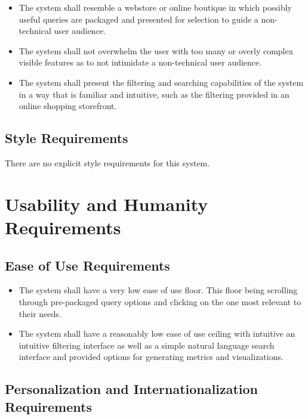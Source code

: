 \documentclass[12pt]{article}
\begin{document}
\begin{itemize}
    \item The system shall resemble a webstore or online boutique in which possibly useful queries are packaged and presented for selection to guide 
    a non-technical user audience.
    \item The system shall not overwhelm the user with too many or overly complex visible features as to not intimidate a non-technical user audience.
    \item The system shall present the filtering and searching capabilities of the system in a way that is familiar and intuitive, such as the 
    filtering provided in an online shopping storefront.
\end{itemize}

\subsection{Style Requirements}

\par{There are no explicit style requirements for this system.}

\section{Usability and Humanity Requirements}



\subsection{Ease of Use Requirements}

\begin{itemize}
    \item The system shall have a very low ease of use floor. This floor being scrolling through
    pre-packaged query options and clicking on the one most relevant to their needs.
    \item The system shall have a reasonably low ease of use ceiling with intuitive an intuitive filtering interface
    as well as a simple natural language search interface and provided options for generating metrics and visualizations.
\end{itemize}

\subsection{Personalization and Internationalization Requirements}
\end{document}
